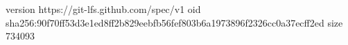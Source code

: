 version https://git-lfs.github.com/spec/v1
oid sha256:90f70ff53d3e1ed8ff2b829eebfb56fef803b6a1973896f2326cc0a37ecff2ed
size 734093
